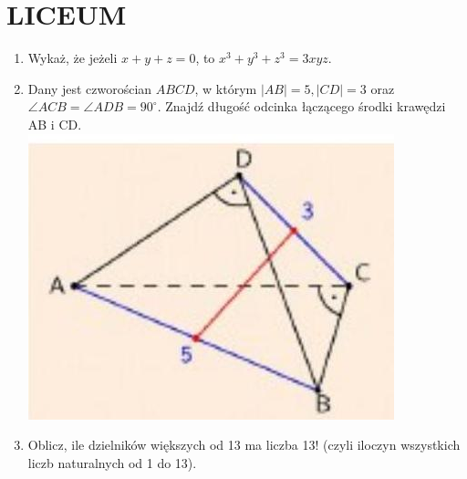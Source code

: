 \documentclass[10pt]{article}
\begin{document}
\section*{LICEUM}
\begin{enumerate}
  \item Wykaż, że jeżeli \(x+y+z=0\), to \(x^{3}+y^{3}+z^{3}=3 x y z\).
  \item Dany jest czworościan \(A B C D\), w którym \(|A B|=5,|C D|=3\) oraz \(\angle A C B=\angle A D B=90^{\circ}\). Znajdź długość odcinka łączącego środki krawędzi AB i CD.\\
\includegraphics[max width=\textwidth, center]{2024_11_21_2f6840cbb6136169e919g-1}
  \item Oblicz, ile dzielników większych od 13 ma liczba 13! (czyli iloczyn wszystkich liczb naturalnych od 1 do 13).
\end{enumerate}
\end{document}
